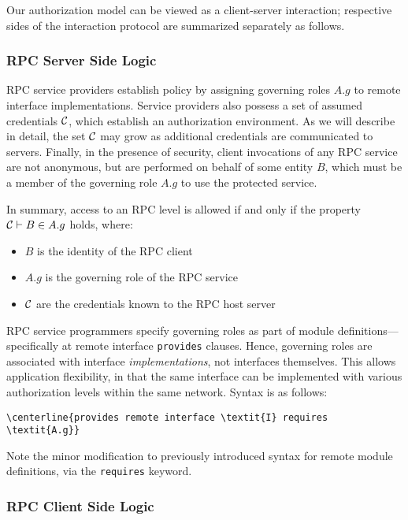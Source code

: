 Our authorization model can be viewed as a client-server interaction;
respective sides of the interaction protocol are summarized separately
as follows.

\subsubsection{RPC Server Side Logic}
\label{section-rpc-server-side}

RPC service providers establish policy by assigning governing roles
$A.g$ to remote interface implementations. Service providers also
possess a set of assumed credentials $\mathcal{C}$, which establish an
authorization environment. As we will describe in detail, the set
$\mathcal{C}$ may grow as additional credentials are communicated to servers.
Finally, in the presence of security, client invocations of any RPC
service are not anonymous, but are performed on behalf of some entity
$B$, which must be a member of the governing role $A.g$ to use the
protected service.

In summary, access to an RPC level is allowed if and only if the
property $\mathcal{C} \vdash B \in A.g$ holds, where:
\begin{itemize}
  \item $B$ is the identity of the RPC client
  \item $A.g$ is the governing role of the RPC service
  \item $\mathcal{C}$ are the credentials known to the RPC host server
\end{itemize}
RPC service programmers specify governing roles as part of module
definitions---specifically at remote interface \texttt{provides}
clauses. Hence, governing roles are associated with interface
\emph{implementations}, not interfaces themselves. This allows
application flexibility, in that the same interface can be implemented
with various authorization levels within the same network. Syntax is as
follows:
\begin{Verbatim}[commandchars=\\\{\}]
\centerline{provides remote interface \textit{I} requires \textit{A.g}}
\end{Verbatim}

Note the minor modification to previously introduced syntax for remote
module definitions, via the \texttt{requires} keyword.

\subsubsection{RPC Client Side Logic}
\label{section-rpc-client-side}

